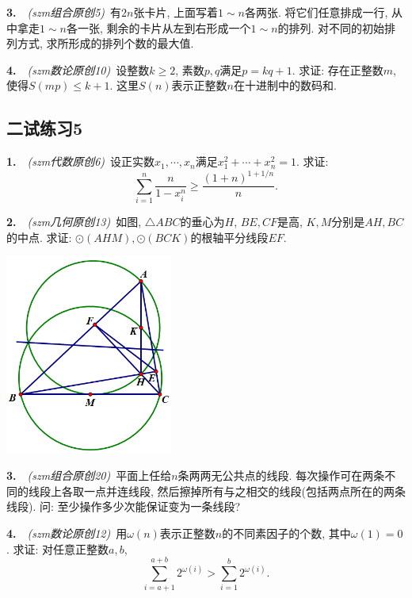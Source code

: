 \newpage

\textbf{3.}~~\textit{(szm组合原创5)}~有$2n$张卡片, 上面写着$1 \sim n$各两张. 将它们任意排成一行, 从中拿走$1 \sim n$各一张, 剩余的卡片从左到右形成一个$1 \sim n$的排列. 对不同的初始排列方式, 求所形成的排列个数的最大值. 

\vspace{25em}

\textbf{4.}~~\textit{(szm数论原创10)}~设整数$k \geq 2$, 素数$p,q$满足$p=kq+1$. 求证: 存在正整数$m$, 使得$S(mp) \leq k+1$. 这里$S(n)$表示正整数$n$在十进制中的数码和. 


\newpage
\subsection*{二试练习5}

\textbf{1.}~~\textit{(szm代数原创6)}~设正实数$x_1,\cdots ,x_n$满足$x_1^2+\cdots +x_n^2=1$. 求证: $$\sum_{i=1}^{n} \frac{n}{1-x_i^n} \geq \frac{(1+n)^{1+1/n}}{n}.$$

\vspace{22em}

\textbf{2.}~~\textit{(szm几何原创13)}~如图, $\triangle ABC$的垂心为$H$, $BE, CF$是高, $K,M$分别是$AH,BC$的中点. 求证: $\odot (AHM), \odot (BCK)$的根轴平分线段$EF$. 

\vspace{2em}
\includegraphics[width=5.5cm]{attachment/g13.png}

\newpage

\textbf{3.}~~\textit{(szm组合原创20)}~平面上任给$n$条两两无公共点的线段. 每次操作可在两条不同的线段上各取一点并连线段, 然后擦掉所有与之相交的线段(包括两点所在的两条线段). 问: 至少操作多少次能保证变为一条线段? 

\vspace{24em}

\textbf{4.}~~\textit{(szm数论原创12)}~用$\omega (n)$表示正整数$n$的不同素因子的个数, 其中$\omega (1)=0$. 求证: 对任意正整数$a,b$, $$\sum_{i=a+1}^{a+b} 2^{\omega (i)} > \sum_{i=1}^{b} 2^{\omega (i)}.$$





